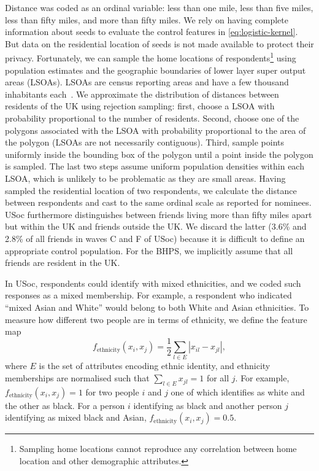 \documentclass{scrartcl}
\newcommand{\abs}[1]{\left|#1\right|}
\begin{document}
Distance was coded as an ordinal variable: less than one mile, less than five miles, less than fifty miles, and more than fifty miles. We rely on having complete information about seeds to evaluate the control features in \cref{eq:logistic-kernel}. But data on the residential location of seeds is not made available to protect their privacy. Fortunately, we can sample the home locations of respondents\footnote{Sampling home locations cannot reproduce any correlation between home location and other demographic attributes.} using population estimates and the geographic boundaries of lower layer super output areas (LSOAs). LSOAs are census reporting areas and have a few thousand inhabitants each~\cite{Lsoas}. We approximate the distribution of distances between residents of the UK using rejection sampling:
first, choose a LSOA with probability proportional to the number of residents. Second, choose one of the polygons associated with the LSOA with probability proportional to the area of the polygon (LSOAs are not necessarily contiguous). Third, sample points uniformly inside the bounding box of the polygon until a point inside the polygon is sampled. The last two steps assume uniform population densities within each LSOA, which is unlikely to be problematic as they are small areas. Having sampled the residential location of two respondents, we calculate the distance between respondents and cast to the same ordinal scale as reported for nominees. USoc furthermore distinguishes between friends living more than fifty miles apart but within the UK and friends outside the UK. We discard the latter (3.6\% and 2.8\% of all friends in waves C and F of USoc) because it is difficult to define an appropriate control population. For the BHPS, we implicitly assume that all friends are resident in the UK.

In USoc, respondents could identify with mixed ethnicities, and we coded such responses as a mixed membership. For example, a respondent who indicated ``mixed Asian and White'' would belong to both White and Asian ethnicities. To measure how different two people are in terms of ethnicity, we define the feature map
\[
    f_\text{ethnicity}(x_i, x_j) = \frac{1}{2} \sum_{l\in E}\abs{x_{il}-x_{jl}},
\]
where $E$ is the set of attributes encoding ethnic identity, and ethnicity memberships are normalised such that $\sum_{l\in E}x_{jl}=1$ for all $j$. For example, $f_\text{ethnicity}(x_i, x_j)=1$ for two people $i$ and $j$ one of which identifies as white and the other as black. For a person $i$ identifying as black and another person $j$ identifying as mixed black and Asian, $f_\text{ethnicity}(x_i, x_j)=0.5$.
\end{document}
